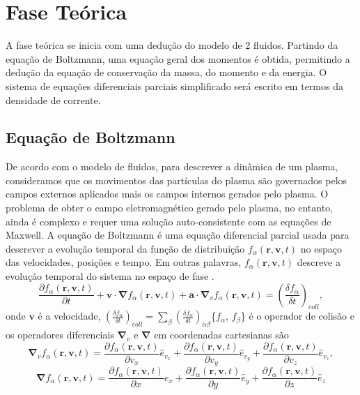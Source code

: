 \documentclass[12pt,oneside,a4paper]{abntex2}
\begin{document}
\chapter{Fase Teórica}
\label{faseteorica}
\noindent A fase teórica se inicia com uma dedução do modelo de 2 fluidos. 
Partindo da equação de Boltzmann, uma equação geral dos momentos é obtida, permitindo a dedução da equação de conservação da massa, do momento e da energia. 
O sistema de equações diferenciais parciais simplificado será escrito em termos da densidade de corrente. 
 
\section{Equação de Boltzmann}
\noindent De acordo com o modelo de fluidos, para descrever a dinâmica de um plasma, consideramos que os movimentos das partículas do plasma são governados pelos campos externos aplicados mais os campos internos gerados pelo plasma. O problema de obter o campo eletromagnético gerado pelo plasma, no entanto, ainda é complexo e requer uma solução auto-consistente com as equações de Maxwell.
A equação de Boltzmann é uma equação diferencial parcial usada para descrever a evolução temporal da função de distribuição $f_\alpha(\bm{r},\bm{v},t)$ no espaço das velocidades, posições e tempo. Em outras palavras, $f_\alpha(\bm{r},\bm{v},t)$ descreve a evolução temporal do sistema no espaço de fase \cite[pg. 193]{bittencourt}.
\begin{equation}
\label{eq: boltsmam}
\frac{\partial f_\alpha(\bm{r},\bm{v},t)}{\partial t} +\bm{v} \cdot \bm{\nabla} f_\alpha(\bm{r},\bm{v},t) + \bm{a} \cdot \bm{\nabla}_v f_\alpha(\bm{r},\bm{v},t) = \left( \frac{\delta f_\alpha}{\delta t} \right)_{coll} ,
\end{equation}   %
onde $\bm{v}$ é a velocidade, $ \left( \frac{\delta f_\alpha}{\delta t} \right)_{coll} = \sum_\beta  \left( \frac{\delta f_\alpha}{\delta t} \right)_{\alpha \beta}$\{$f_\alpha$, $f_\beta$\} é o operador de colisão e os operadores diferenciais $\bm{\nabla}_v$ e $\bm{\nabla}$ em coordenadas cartesianas são 
$$\bm{\nabla}_v f_\alpha(\bm{r},\bm{v},t) =  \frac{\partial f_\alpha(\bm{r},\bm{v},t)}{\partial v_x} \hat{e}_{v_x} + \frac{\partial f_\alpha(\bm{r},\bm{v},t)}{\partial v_y} \hat{e}_{v_y} + \frac{\partial f_\alpha(\bm{r},\bm{v},t)}{\partial v_z} \hat{e}_{v_z}, $$  
$$\bm{\nabla} f_\alpha(\bm{r},\bm{v},t) = \frac{\partial f_\alpha(\bm{r},\bm{v},t)}{\partial x} \hat{e}_{x} + \frac{\partial f_\alpha(\bm{r},\bm{v},t)}{\partial y} \hat{e}_{y} + \frac{\partial f_\alpha(\bm{r},\bm{v},t)}{\partial z} \hat{e}_{z}$$
\end{document}
